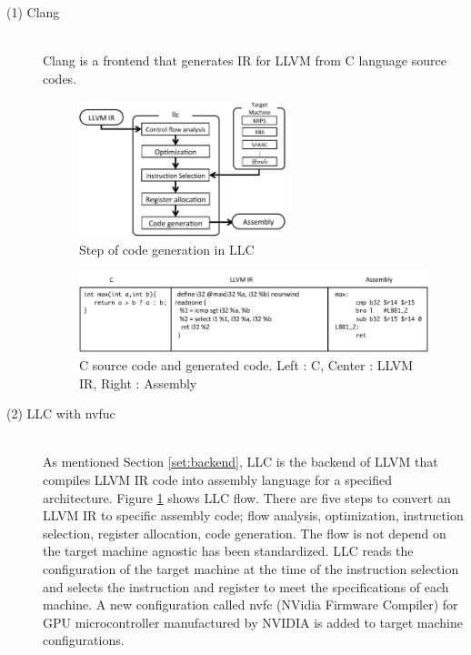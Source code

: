\begin{description}
\item[ (1) Clang]\mbox{}\\
Clang is a frontend that generates IR for LLVM from C language source codes.

\begin{figure}
\begin{center}
\includegraphics[width=6cm]{./img/llc.pdf}
\end{center}
\caption{Step of code generation in LLC}
\label{fig:llc}
\end{figure}

\begin{figure}
\begin{center}
\includegraphics[width=12cm]{./img/llvm_code.pdf}
\end{center}
\caption{C source code and generated code. Left : C, Center : LLVM IR, Right : Assembly}
\label{fig:llvm_code}
\end{figure}
\item[ (2) LLC with nvfuc]\mbox{}\\
As mentioned Section \ref{set:backend}, LLC is the backend of LLVM that compiles LLVM IR code into assembly language for a specified architecture.
Figure \ref{fig:llc} shows LLC flow.
There are five steps to convert an LLVM IR to specific assembly code; flow analysis, optimization, instruction selection, register allocation, code generation.
The flow is not depend on the target machine agnostic has been standardized.
LLC reads the configuration of the target machine at the time of the instruction selection and selects the instruction and register to meet the specifications of each machine. 
A new configuration called nvfc (NVidia Firmware Compiler) for GPU microcontroller manufactured by NVIDIA is added to target machine configurations.


\end{description}
